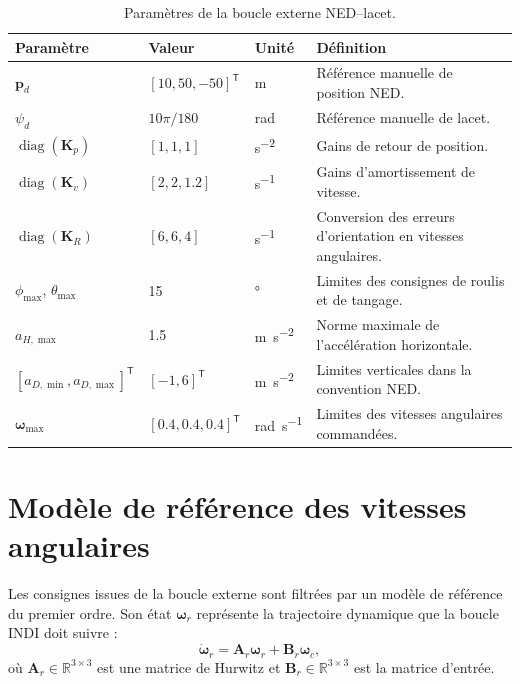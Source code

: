 \documentclass[11pt,a4paper,oneside]{report}
\newcommand{\vect}[1]{\bm{#1}}
\newcommand{\mat}[1]{\bm{#1}}
\newcommand{\trans}{^{\mathsf T}}
\newcommand{\diag}{\operatorname{diag}}
\begin{document}
\begin{table}[H]
	\centering
	\caption{Paramètres de la boucle externe NED--lacet.}
	\label{tab_outer_loop}
	\begin{tabularx}{\textwidth}{@{}L{5.0cm}L{4.5cm}L{2.8cm}Y@{}}
		\toprule
		\textbf{Paramètre} &
		\textbf{Valeur} &
		\textbf{Unité} &
		\textbf{Définition}\\
		\midrule
		$\vect p_d$ &
		$[10,50,-50]\trans$ &
		\si{m} &
		Référence manuelle de position NED.\\
		$\psi_d$ &
		$10\pi/180$ &
		\si{rad} &
		Référence manuelle de lacet.\\
		$\diag(\mat K_p)$ &
		$[1,1,1]$ &
		\si{s^{-2}} &
		Gains de retour de position.\\
		$\diag(\mat K_v)$ &
		$[2,2,1.2]$ &
		\si{s^{-1}} &
		Gains d'amortissement de vitesse.\\
		$\diag(\mat K_R)$ &
		$[6,6,4]$ &
		\si{s^{-1}} &
		Conversion des erreurs d'orientation en vitesses angulaires.\\
		$\phi_{\max}$, $\theta_{\max}$ &
		\num{15} &
		\si{\degree} &
		Limites des consignes de roulis et de tangage.\\
		$a_{H,\max}$ &
		\num{1.5} &
		\si{m.s^{-2}} &
		Norme maximale de l'accélération horizontale.\\
		$[a_{D,\min},a_{D,\max}]\trans$ &
		$[-1,6]\trans$ &
		\si{m.s^{-2}} &
		Limites verticales dans la convention NED.\\
		$\vect\omega_{\max}$ &
		$[0.4,0.4,0.4]\trans$ &
		\si{rad.s^{-1}} &
		Limites des vitesses angulaires commandées.\\
		\bottomrule
	\end{tabularx}
\end{table}

\section{Modèle de référence des vitesses angulaires}

Les consignes issues de la boucle externe sont filtrées par un modèle de référence du premier ordre. Son état $\vect\omega_r$ représente la trajectoire dynamique que la boucle INDI doit suivre :
\begin{equation}
	\dot{\vect\omega}_r
	=
	\mat A_r\vect\omega_r
	+
	\mat B_r\vect\omega_c,
	\label{eq_reference_model}
\end{equation}
où $\mat A_r\in\mathbb{R}^{3\times3}$ est une matrice de Hurwitz et $\mat B_r\in\mathbb{R}^{3\times3}$ est la matrice d'entrée.
\end{document}
